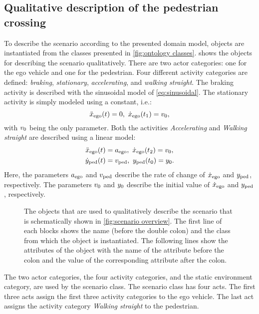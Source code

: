 \subsection{Qualitative description of the pedestrian crossing}
\label{sec:example qualitative}
To describe the scenario according to the presented domain model, objects are instantiated from the classes presented in \cref{fig:ontology classes}.  shows the objects for describing the scenario qualitatively. There are two actor categories: one for the ego vehicle and one for the pedestrian. Four different activity categories are defined: \emph{braking}, \emph{stationary}, \emph{accelerating}, and \emph{walking straight}. The braking activity is described with the sinusoidal model of \cref{eq:sinusoidal}. The stationary activity is simply modeled using a constant, i.e.:
\cbstartc
\begin{equation} \label{eq:constant model}
	\ddot{x}_{\mathrm{ego}}(t) = 0,\ \dot{x}_{\mathrm{ego}}(t_{1}) = v_{0},
\end{equation}
with $v_{0}$ being the only parameter.
Both the activities \emph{Accelerating} and \emph{Walking straight} are described using a linear model:
\begin{align}
	\ddot{x}_{\mathrm{ego}}(t) &= a_{\mathrm{ego}},\ \dot{x}_{\mathrm{ego}}(t_{2}) = v_{0}, \label{eq:ego accelerating} \\
	\dot{y}_{\mathrm{ped}}(t) &= v_{\mathrm{ped}},\ y_{\mathrm{ped}}(t_{0}) = y_{0}. \label{eq:pedestrian walking}
\end{align}
Here, the parameters $a_{\mathrm{ego}}$ and $v_{\mathrm{ped}}$ describe the rate of change of $\dot{x}_{\mathrm{ego}}$ and $y_{\mathrm{ped}}$, respectively. The parameters $v_{0}$ and $y_{0}$ describe the initial value of $\dot{x}_{\mathrm{ego}}$ and $y_{\mathrm{ped}}$, respectively.
\cbend

\begin{figure}
	\centering
	
	\caption{The objects that are used to qualitatively describe the scenario that is schematically shown in \cref{fig:scenario overview}. The first line of each blocks shows the name (before the double colon) and the class from which the object is instantiated. The following lines show the attributes of the object with the name of the attribute before the colon and the value of the corresponding attribute after the colon.}
	\label{fig:example qualitative}
\end{figure}

\cbstart
The two actor categories, the four activity categories, and the static environment category, are used by the scenario class. The scenario class has four acts. The first three acts assign the first three activity categories to the ego vehicle. The last act assigns the activity category \emph{Walking straight} to the pedestrian.

